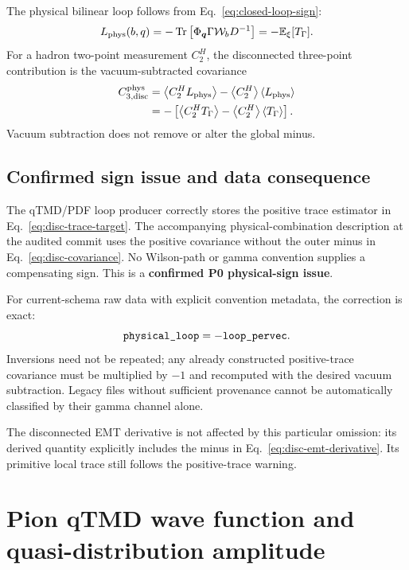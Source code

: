\documentclass[11pt,a4paper]{article}
\numberwithin{equation}{section}
\newcommand{\Tr}{\operatorname{Tr}}
\newcommand{\avg}[1]{\left\langle #1\right\rangle}
\newcommand{\cW}{\mathcal{W}}
\newcommand{\code}[1]{%
  \ifmmode\text{\texttt{\detokenize{#1}}}\else\nolinkurl{#1}\fi}
\newcommand{\bad}[1]{\textcolor{auditred}{\textbf{#1}}}
\begin{document}
The physical bilinear loop follows from
Eq.~\eqref{eq:closed-loop-sign}:
\begin{equation}
 L_{\rm phys}(b,q)
 =-\Tr\left[
 \Phi_{\boldsymbol q}\Gamma\cW_bD^{-1}
 \right]
 =-\mathbb E_\xi[T_\Gamma].
 \label{eq:disc-physical-loop}
\end{equation}
For a hadron two-point measurement \(C_2^H\), the disconnected three-point
contribution is the vacuum-subtracted covariance
\begin{align}
 C_{3,\rm disc}^{\rm phys}
 &=
 \avg{C_2^H L_{\rm phys}}
 -\avg{C_2^H}\avg{L_{\rm phys}}
 \nonumber\\
 &=-\left[
 \avg{C_2^H T_\Gamma}
 -\avg{C_2^H}\avg{T_\Gamma}
 \right].
 \label{eq:disc-covariance}
\end{align}
Vacuum subtraction does not remove or alter the global minus.

\subsection{Confirmed sign issue and data consequence}

The qTMD/PDF loop producer correctly stores the positive trace estimator in
Eq.~\eqref{eq:disc-trace-target}.  The accompanying physical-combination
description at the audited commit uses the positive covariance without the
outer minus in Eq.~\eqref{eq:disc-covariance}.  No Wilson-path or gamma
convention supplies a compensating sign.  This is a \bad{confirmed P0
physical-sign issue}.

For current-schema raw data with explicit convention metadata, the correction
is exact:
\begin{equation}
 \code{physical_loop}=-\code{loop_pervec}.
\end{equation}
Inversions need not be repeated; any already constructed positive-trace
covariance must be multiplied by \(-1\) and recomputed with the desired
vacuum subtraction.  Legacy files without sufficient provenance cannot be
automatically classified by their gamma channel alone.

The disconnected EMT derivative is not affected by this particular omission:
its derived quantity explicitly includes the minus in
Eq.~\eqref{eq:disc-emt-derivative}.  Its primitive local trace still follows
the positive-trace warning.

\section{Pion qTMD wave function and quasi-distribution amplitude}
\end{document}
